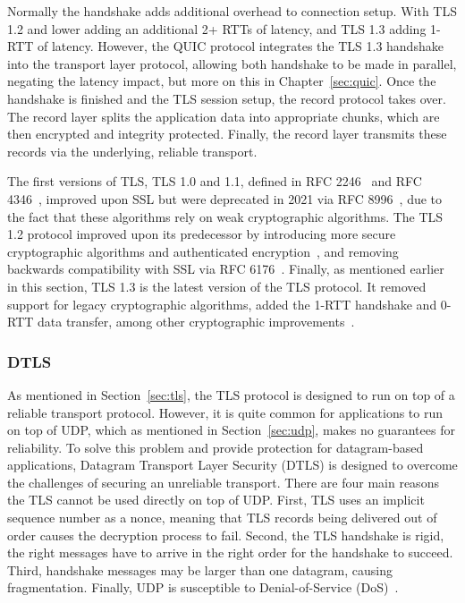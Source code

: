 \documentclass[english, 12pt, a4paper, elec, utf8, a-2b, online]{aaltothesis}
\begin{document}
Normally the handshake adds additional overhead to connection setup. With TLS 1.2 and
lower adding an additional 2+ RTTs of latency, and TLS 1.3 adding 1-RTT of latency.
However, the QUIC protocol integrates the TLS 1.3 handshake into the transport layer protocol,
allowing both handshake to be made in parallel, negating the latency impact, but more
on this in Chapter~\ref{sec:quic}. Once the handshake is finished and the TLS session setup,
the record protocol takes over. The record layer splits the application data into
appropriate chunks, which are then encrypted and integrity protected. Finally, the record layer transmits
these records via the underlying, reliable transport.

The first versions of TLS, TLS 1.0 and 1.1, defined in RFC 2246~\cite{rfc2246} and
RFC 4346~\cite{rfc4346}, improved upon SSL but were deprecated in 2021 via RFC 8996~\cite{rfc8996},
due to the fact that these algorithms rely on weak cryptographic algorithms. The TLS 1.2
protocol improved upon its predecessor by introducing more secure cryptographic algorithms and
authenticated encryption~\cite{rfc5246}, and removing backwards compatibility with
SSL via RFC 6176~\cite{rfc6176}. Finally, as mentioned earlier in this section,
TLS 1.3 is the latest version of the TLS protocol. It removed support for legacy
cryptographic algorithms, added the 1-RTT handshake and 0-RTT data transfer, among other
cryptographic improvements~\cite{rfc8446}.

\subsubsection{DTLS}

As mentioned in Section~\ref{sec:tls}, the TLS protocol is designed to run on top
of a reliable transport protocol. However, it is quite common for applications to run on top
of UDP, which as mentioned in Section~\ref{sec:udp}, makes no guarantees for reliability.
To solve this problem and provide protection for datagram-based applications,
Datagram Transport Layer Security (DTLS) is designed to overcome the challenges
of securing an unreliable transport. There are four main reasons the TLS cannot
be used directly on top of UDP. First, TLS uses an implicit sequence number as a
nonce, meaning that TLS records being delivered out of order causes the decryption
process to fail. Second, the TLS handshake is rigid, the right messages have to arrive
in the right order for the handshake to succeed. Third, handshake messages may be 
larger than one datagram, causing fragmentation. Finally, UDP is susceptible to
Denial-of-Service (DoS)~\cite{rfc9147}.
\end{document}
